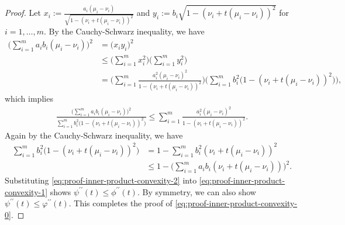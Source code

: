 \documentclass[journal,draftcls, onecolumn]{IEEEtran}
\begin{document}
\begin{proof}
Let $x_i := \frac{a_i(\mu_i-\nu_i)}{\sqrt{1-(\nu_i+t(\mu_i-\nu_i))^2}}$ and $y_i:= b_i \sqrt{1-(\nu_i + t(\mu_i-\nu_i))^2}$ for $i=1,\ldots,m$.
By the Cauchy-Schwarz inequality, we have
\begin{align*}
\bigg( \sum_{i=1}^m a_i b_i (\mu_i-\nu_i) \bigg)^2 &= \bigg( x_i y_i\bigg)^2 \\
&\le \bigg( \sum_{i=1}^m x_i^2 \bigg)\bigg( \sum_{i=1}^m y_i^2\bigg) \\
&= \bigg( \sum_{i=1}^m \frac{a_i^2 (\mu_i-\nu_i)^2}{1- (\nu_i +t(\mu_i-\nu_i))^2} \bigg) 
 \bigg( \sum_{i=1}^m b_i^2 \big(1- (\nu_i + t(\mu_i-\nu_i))^2\big) \bigg),
\end{align*}
which implies 
\begin{align}
\frac{\big(\sum_{i=1}^m a_i b_i (\mu_i - \nu_i)\big)^2}{\sum_{i=1}^m b_i^2\big(1 - (\nu_i + t(\mu_i-\nu_i))^2 \big)} 
 \le \sum_{i=1}^m \frac{a_i^2 (\mu_i - \nu_i)^2}{1 - (\nu_i + t(\mu_i-\nu_i))^2}. \label{eq:proof-inner-product-convexity-1}
\end{align}
Again by the Cauchy-Schwarz inequality, we have
\begin{align}
\sum_{i=1}^m b_i^2 \big( 1- (\nu_i + t(\mu_i-\nu_i))^2 \big) &= 1 - \sum_{i=1}^m b_i^2 (\nu_i + t(\mu_i-\nu_i))^2 \nonumber \\
&\le 1 - \bigg( \sum_{i=1}^m a_i b_i (\nu_i + t(\mu_i-\nu_i)) \bigg)^2. \label{eq:proof-inner-product-convexity-2}
\end{align}
Substituting \eqref{eq:proof-inner-product-convexity-2} into \eqref{eq:proof-inner-product-convexity-1} shows 
$\psi^{\prime\prime}(t) \le \phi^{\prime\prime}(t)$. By symmetry, we can also show $\psi^{\prime\prime}(t) \le \varphi^{\prime\prime}(t)$.
This completes the proof of \eqref{eq:proof-inner-product-convexity-0}.
\end{proof}
\end{document}
